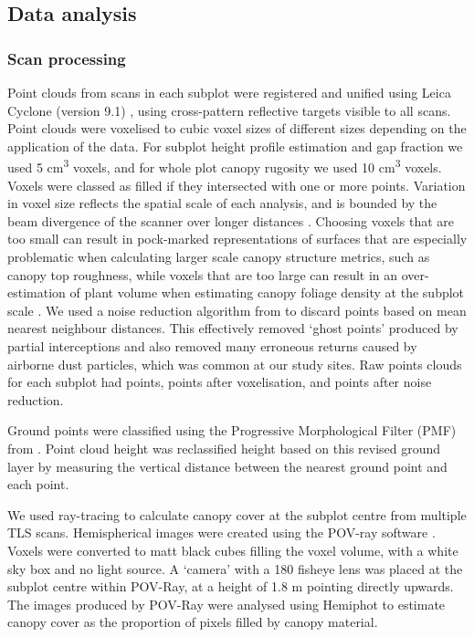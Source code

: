 \documentclass[11pt,a4paper]{article}
\newcommand{\textapprox}{\raisebox{0.5ex}{\texttildelow}}  %
\begin{document}
\subsection{Data analysis}

\subsubsection{Scan processing}

Point clouds from scans in each subplot were registered and unified using Leica Cyclone (version 9.1) \citep{Cyclone}, using cross-pattern reflective targets visible to all scans. Point clouds were voxelised to cubic voxel sizes of different sizes depending on the application of the data. For subplot height profile estimation and gap fraction we used 5 cm\textsuperscript{3} voxels, and for whole plot canopy rugosity we used 10 cm\textsuperscript{3} voxels. Voxels were classed as filled if they intersected with one or more points. Variation in voxel size reflects the spatial scale of each analysis, and is bounded by the beam divergence of the scanner over longer distances \citep{}. Choosing voxels that are too small can result in pock-marked representations of surfaces that are especially problematic when calculating larger scale canopy structure metrics, such as canopy top roughness, while voxels that are too large can result in an over-estimation of plant volume when estimating canopy foliage density at the subplot scale \citep{Seidel2012, Cifuentes2014}. We used a noise reduction algorithm from \citet{} to discard points based on mean nearest neighbour distances. This effectively removed `ghost points' produced by partial interceptions and also removed many erroneous returns caused by airborne dust particles, which was common at our study sites. Raw points clouds for each subplot had \textapprox{}\rawpt{} points, \textapprox{}\voxelpt{} points after voxelisation, and \textapprox{}\subpt{} points after noise reduction.

Ground points were classified using the Progressive Morphological Filter (PMF) from \citet{Zhang2003}. Point cloud height was reclassified height based on this revised ground layer by measuring the vertical distance between the nearest ground point and each point.

We used ray-tracing to calculate canopy cover at the subplot centre from multiple TLS scans. Hemispherical images were created using the POV-ray software \citep{}. Voxels were converted to matt black cubes filling the voxel volume, with a white sky box and no light source. A `camera' with a 180\textdegree{} fisheye lens was placed at the subplot centre within POV-Ray, at a height of 1.8 m pointing directly upwards. The images produced by POV-Ray were analysed using Hemiphot \citep{Steege} to estimate canopy cover as the proportion of pixels filled by canopy material.
\end{document}
